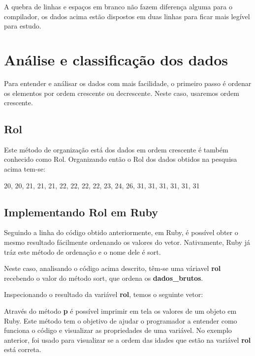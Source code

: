 \documentclass[espaco=simples,appendix=Name]{abnt}
\begin{document}
A quebra de linhas e espaços em branco não fazem diferença alguma para o compilador, os dados acima estão dispostos em duas linhas para ficar mais legível para estudo.


\section { Análise e classificação dos dados }

Para entender e análisar os dados com mais facilidade, o primeiro passo é ordenar os elementos por ordem crescente ou decrescente. Neste caso, usaremos ordem crescente. 


\subsection { Rol }

Este método de organização está dos dados em ordem crescente é também conhecido como Rol. Organizando então o Rol dos dados obtidos na pesquisa acima tem-se:

20, 20, 21, 21, 21, 22, 22, 22, 22, 23, 24, 26, 31, 31, 31, 31, 31, 31

\subsection { Implementando Rol em Ruby }

Seguindo a linha do código obtido anteriormente, em Ruby, é possível obter o mesmo resultado fácilmente ordenando os valores do vetor. Nativamente, Ruby já tráz este método de ordenação e o nome dele é sort.

 

Neste caso, analisando o código acima descrito, têm-se uma váriavel \textbf{rol} recebendo o valor do método sort, que ordena os \textbf{dados\_brutos}.

Inspecionando o resultado da variável \textbf{rol}, temos o seguinte vetor:


 

Através do método \textbf{p} é possível imprimir em tela os valores de um objeto em Ruby. Este método tem o objetivo de ajudar o programador a entender como funciona o código e visualizar as propriedades de uma variável. No exemplo anterior, foi usado para visualizar se a ordem das idades que estão na variável \textbf{rol} está correta.
\end{document}
